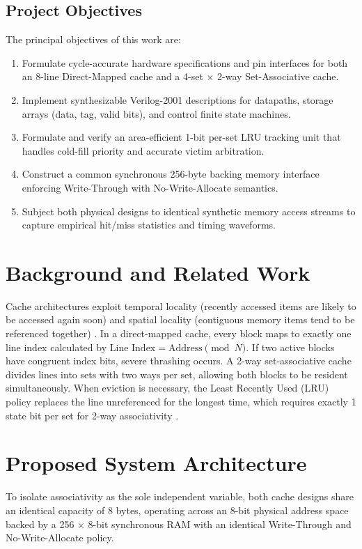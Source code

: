 \documentclass[10pt,twocolumn]{article}
\begin{document}
\subsection{Project Objectives}
The principal objectives of this work are:
\begin{enumerate}
    \item Formulate cycle-accurate hardware specifications and pin interfaces for both an 8-line Direct-Mapped cache and a 4-set $\times$ 2-way Set-Associative cache.
    \item Implement synthesizable Verilog-2001 descriptions for datapaths, storage arrays (data, tag, valid bits), and control finite state machines.
    \item Formulate and verify an area-efficient 1-bit per-set LRU tracking unit that handles cold-fill priority and accurate victim arbitration.
    \item Construct a common synchronous 256-byte backing memory interface enforcing Write-Through with No-Write-Allocate semantics.
    \item Subject both physical designs to identical synthetic memory access streams to capture empirical hit/miss statistics and timing waveforms.
\end{enumerate}

\section{Background and Related Work}
Cache architectures exploit temporal locality (recently accessed items are likely to be accessed again soon) and spatial locality (contiguous memory items tend to be referenced together) \cite{hennessy2017}. In a direct-mapped cache, every block maps to exactly one line index calculated by $\text{Line Index} = \text{Address} \pmod N$. If two active blocks have congruent index bits, severe thrashing occurs. A 2-way set-associative cache divides lines into sets with two ways per set, allowing both blocks to be resident simultaneously. When eviction is necessary, the Least Recently Used (LRU) policy replaces the line unreferenced for the longest time, which requires exactly 1 state bit per set for 2-way associativity \cite{smith1983}.

\section{Proposed System Architecture}
To isolate associativity as the sole independent variable, both cache designs share an identical capacity of 8 bytes, operating across an 8-bit physical address space backed by a 256 $\times$ 8-bit synchronous RAM with an identical Write-Through and No-Write-Allocate policy.
\end{document}

